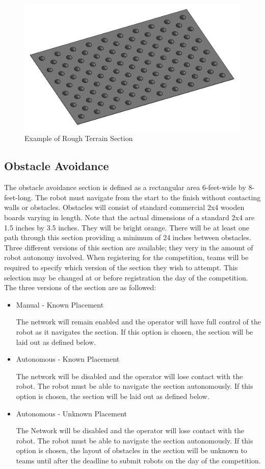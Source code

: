 \begin{figure}[H]
	\centering
	\includegraphics[width=.85\textwidth]{images/rough_terrain.png}
	\caption{Example of Rough Terrain Section}
	\label{fig:rough_terrain} 
\end{figure}

\subsection{Obstacle Avoidance}
The obstacle avoidance section is defined as a rectangular area 6-feet-wide by 8-feet-long. The robot must navigate from the start to the finish without contacting walls or obstacles. Obstacles will consist of standard commercial 2x4 wooden boards varying in length. Note that the actual dimensions of a standard 2x4 are 1.5 inches by 3.5 inches. They will be bright orange. There will be at least one path through this section providing a minimum of 24 inches between obstacles. Three different versions of this section are available; they very in the amount of robot autonomy involved. When registering for the competition, teams will be required to specify which version of the section they wish to attempt. This selection may be changed at or before registration the day of the competition. The three versions of the section are as followed:

\begin{itemize}
    \item Manual - Known Placement
    
        The network will remain enabled and the operator will have full control of the robot as it navigates the section. If this option is chosen, the section will be laid out as defined below.
    \item Autonomous - Known Placement
    
        The network will be disabled and the operator will lose contact with the robot. The robot must be able to navigate the section autonomously. If this option is chosen, the section will be laid out as defined below.
    \item Autonomous - Unknown Placement
    
        The Network will be disabled and the operator will lose contact with the robot. The robot must be able to navigate the section autonomously. If this option is chosen, the layout of obstacles in the section will be unknown to teams until after the deadline to submit robots on the day of the competition. 
        
\end{itemize}

